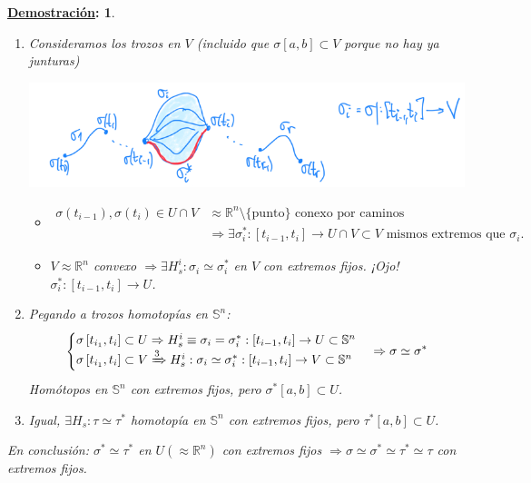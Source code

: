 \documentclass[10pt,a4paper,openright]{book}
\theoremstyle{break}
\newtheorem*{demo}{\underline{Demostración}:}
\begin{document}
\begin{demo}
\begin{enumerate}
    \item Consideramos los trozos en $V$ (incluido que $\sigma\left[ a, b \right] \subset V$ porque no hay ya junturas)
    \begin{center}
        \includegraphics[scale=0.3]{images/esferas_sn_3} 
    \end{center}
    \begin{itemize}
        \item[(*)]
        \begin{align*}
            \sigma\left( t_{i - 1} \right), \sigma\left( t_i \right) \in U \cap V &\approx \mathbb{R}^n \setminus \{\text{punto}\} \text{ conexo por caminos}\\
            &\Rightarrow \exists \sigma_i^*: \left[ t_{i - 1}, t_i \right] \rightarrow U\cap V \subset V \text{ mismos extremos que } \sigma_i
        .\end{align*}

        \item[(**)] $V \approx \mathbb{R}^n$ convexo $\Rightarrow \exists H_s^i: \sigma_i \simeq \sigma_i^*$ en $V$ con extremos fijos. ¡Ojo! $\boxed{\sigma_i^*: \left[ t_{i - 1}, t_i \right] \rightarrow U}$.
    \end{itemize}

    \item Pegando a trozos homotopías en $\mathbb{S}^n$:
    \[
    \begin{cases}
        \sigma\left[ t_{i_1}, t_i \right] \subset U \Rightarrow H_s^i \equiv \sigma_i = \sigma_i^*: \left[ t_{i - 1}, t_i \right] \rightarrow U \subset \mathbb{S}^n\\
        \sigma\left[ t_{i_1}, t_i \right] \subset V \xRightarrow{3} H_s^i : \sigma_i \simeq \sigma_i^*: \left[ t_{i - 1}, t_i \right] \rightarrow V \subset \mathbb{S}^n
    \end{cases} \Rightarrow \sigma \simeq \sigma^* 
    \]
    Homótopos en $\mathbb{S}^n$ con extremos fijos, pero $\sigma^*\left[ a, b \right] \subset U$.

    \item Igual, $\exists H_s: \tau \simeq \tau^*$ homotopía en $\mathbb{S}^n$ con extremos fijos, pero $\tau^*\left[ a, b \right] \subset U$.
\end{enumerate}
En conclusión: $\sigma^* \simeq \tau^*$ en $U \left( \approx \mathbb{R}^n \right)$ con extremos fijos $\Rightarrow \sigma \simeq \sigma^* \simeq \tau^* \simeq \tau$ con extremos fijos.
\end{demo}
\end{document}
